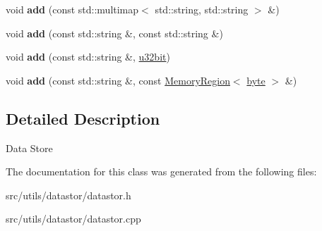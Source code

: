 \begin{DoxyCompactItemize}
\item 
\hypertarget{classBotan_1_1Data__Store_a83319d25d3d220c6c45f8263f5f7d762}{void {\bfseries add} (const std\-::multimap$<$ std\-::string, std\-::string $>$ \&)}\label{classBotan_1_1Data__Store_a83319d25d3d220c6c45f8263f5f7d762}

\item 
\hypertarget{classBotan_1_1Data__Store_a2b305c27d3ea0eafaf4e4e6cba49fabc}{void {\bfseries add} (const std\-::string \&, const std\-::string \&)}\label{classBotan_1_1Data__Store_a2b305c27d3ea0eafaf4e4e6cba49fabc}

\item 
\hypertarget{classBotan_1_1Data__Store_a95f59a23aea89ee56ebbe51c3e240b31}{void {\bfseries add} (const std\-::string \&, \hyperlink{namespaceBotan_aacc7d03c95e97e76168fc1c819031830}{u32bit})}\label{classBotan_1_1Data__Store_a95f59a23aea89ee56ebbe51c3e240b31}

\item 
\hypertarget{classBotan_1_1Data__Store_af56441046d13f7f2858edf266881404e}{void {\bfseries add} (const std\-::string \&, const \hyperlink{classBotan_1_1MemoryRegion}{Memory\-Region}$<$ \hyperlink{namespaceBotan_a7d793989d801281df48c6b19616b8b84}{byte} $>$ \&)}\label{classBotan_1_1Data__Store_af56441046d13f7f2858edf266881404e}

\end{DoxyCompactItemize}


\subsection{Detailed Description}
Data Store 

The documentation for this class was generated from the following files\-:\begin{DoxyCompactItemize}
\item 
src/utils/datastor/datastor.\-h\item 
src/utils/datastor/datastor.\-cpp\end{DoxyCompactItemize}
